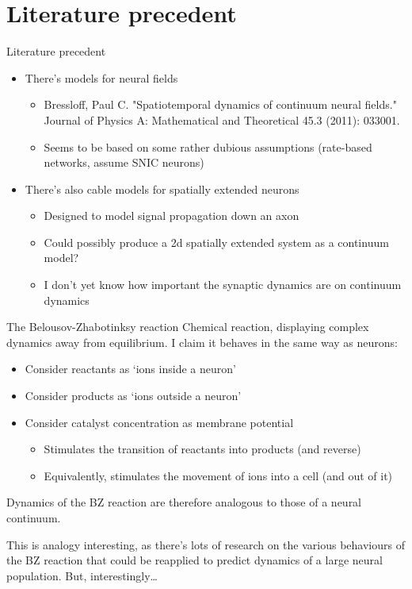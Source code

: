 \documentclass[presentation]{beamer}
\begin{document}
\section{Literature precedent}
\label{sec:org60905c8}
\begin{frame}[label={sec:orgcdcd768}]{Literature precedent}
\begin{itemize}
\item There's models for neural fields
\begin{itemize}
\item Bressloff, Paul C. "Spatiotemporal dynamics of continuum neural fields." Journal of Physics A: Mathematical and Theoretical 45.3 (2011): 033001.
\item Seems to be based on some rather dubious assumptions (rate-based networks, assume SNIC neurons)
\end{itemize}
\item There's also cable models for spatially extended neurons
\begin{itemize}
\item Designed to model signal propagation down an axon
\item Could possibly produce a 2d spatially extended system as a continuum model?
\item I don't yet know how important the synaptic dynamics are on continuum dynamics
\end{itemize}
\end{itemize}
\end{frame}
\begin{frame}[label={sec:orge0ab2e0}]{The Belousov-Zhabotinksy reaction}
Chemical reaction, displaying complex dynamics away from equilibrium.
I claim it behaves in the same way as neurons:
\begin{itemize}
\item Consider reactants as `ions inside a neuron'
\item Consider products as `ions outside a neuron'
\item Consider catalyst concentration as membrane potential
\begin{itemize}
\item Stimulates the transition of reactants into products (and reverse)
\item Equivalently, stimulates the movement of ions into a cell (and out of it)
\end{itemize}
\end{itemize}
Dynamics of the BZ reaction are therefore analogous to those of a neural continuum.

This is analogy interesting, as there's lots of research on the various behaviours of the BZ reaction that could be reapplied to predict dynamics of a large neural population.
But, interestingly\ldots{}
\end{frame}
\end{document}
